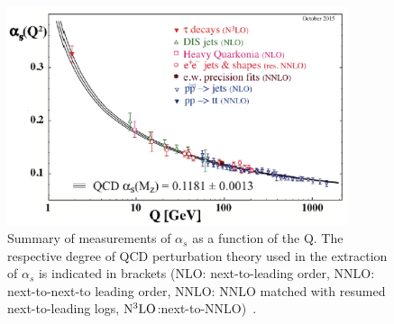 \begin{figure}[!h]
  \centering
  \includegraphics[width=10cm]{chap1/figure/alphas.eps}
  \caption{Summary of measurements of $\alpha_{s}$ as a function of the Q. The respective degree of QCD perturbation theory used in the extraction of $\alpha_{s}$ is indicated in brackets (NLO: next-to-leading order, NNLO: next-to-next-to leading order,  NNLO: NNLO matched with resumed next-to-leading logs, $\rm{N^{3}LO}$:next-to-NNLO)~\cite{bib_pdg}.}
  \label{fig_1_alphas}
\end{figure}

